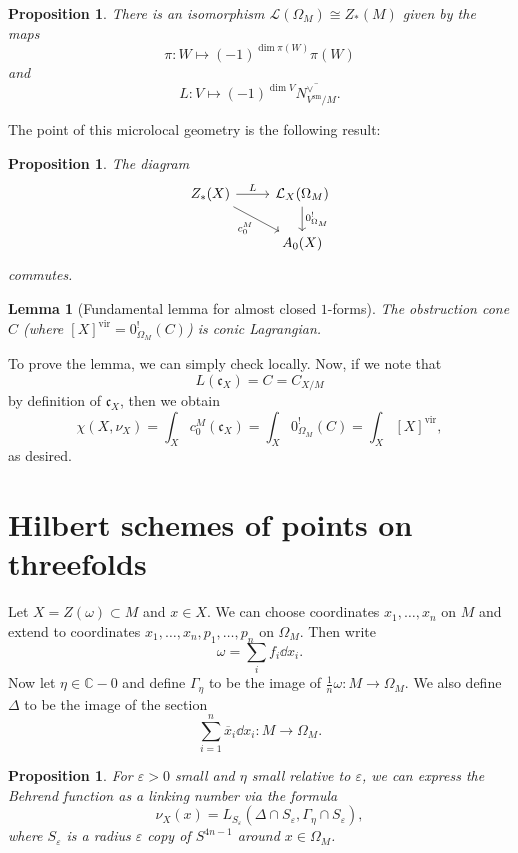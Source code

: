 \documentclass[leqno, openany]{memoir}
\newtheorem{prop}[thm]{Proposition}
\newtheorem{lem}[thm]{Lemma}
\theoremstyle{definition}
\theoremstyle{remark}
\theoremstyle{plain}
\theoremstyle{definition}
\theoremstyle{remark}
\newcommand{\C}{\mathbb{C}}
\newcommand{\ep}{\varepsilon}
\newcommand{\mc}[1]{\mathcal{#1}}
\newcommand{\mf}[1]{\mathfrak{#1}}
\newcommand{\mr}[1]{\mathrm{#1}}
\newcommand{\ol}[1]{\overline{#1}}
\begin{document}
\begin{prop}
    There is an isomorphism $\mc{L}(\Omega_M) \cong Z_*(M)$ given by the maps
    \[ \pi \colon W \mapsto (-1)^{\dim \pi(W)} \pi(W) \]
    and 
    \[ L \colon V \mapsto (-1)^{\dim V} \ol{N^{\vee}_{V^{\mr{sm}}/M}}. \]
\end{prop}

The point of this microlocal geometry is the following result:

\begin{prop}
    The diagram
    \begin{equation*}
    \begin{tikzcd}
        Z_*(X) \ar{r}{L} \ar[swap]{dr}{c_0^M} & \mc{L}_X(\Omega_M) \ar{d}{0^!_{\Omega_M}} \\
        & A_0(X)
    \end{tikzcd}
    \end{equation*}
    commutes.
\end{prop}

\begin{lem}[Fundamental lemma for almost closed $1$-forms]
    The obstruction cone $C$ (where $[X]^{\mr{vir}} = 0^!_{\Omega_M}(C)$) is conic Lagrangian.
\end{lem}

To prove the lemma, we can simply check locally. Now, if we note that
\[ L(\mf{c}_X) = C = C_{X/M} \]
by definition of $\mf{c}_X$, then we obtain
\[ \chi(X, \nu_X) = \int_X c_0^M(\mf{c}_X) = \int_X 0^!_{\Omega_M}(C) = \int_X [X]^{\mr{vir}}, \]
as desired.

\section{Hilbert schemes of points on threefolds}

Let $X = Z(\omega) \subset M$ and $x \in X$. We can choose coordinates $x_1, \ldots, x_n$ on $M$ and extend to coordinates $x_1, \ldots, x_n, p_1, \ldots, p_n$ on $\Omega_M$. Then write
\[ \omega = \sum_i f_i \dd{x_i}. \]
Now let $\eta \in \C - \qty{0}$ and define $\Gamma_{\eta}$ to be the image of $\frac{1}{n} \omega \colon M \to \Omega_M$. We also define $\Delta$ to be the image of the section 
\[ \sum_{i=1}^n \ol{x}_i \dd{x_i} \colon M \to \Omega_M. \]

\begin{prop}
    For $\ep > 0$ small and $\eta$ small relative to $\ep$, we can express the Behrend function as a linking number via the formula
    \[ \nu_X(x) = L_{S_{\ep}} (\Delta \cap S_{\ep}, \Gamma_{\eta} \cap S_{\ep}), \]
    where $S_{\ep}$ is a radius $\ep$ copy of $S^{4n-1}$ around $x \in \Omega_M$.
\end{prop}
\end{document}
